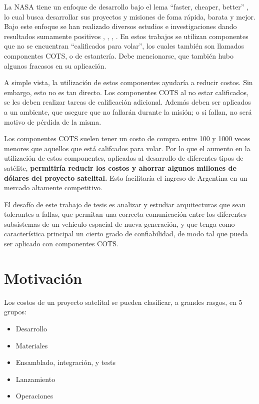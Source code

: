 La \ac{NASA} tiene un enfoque de desarrollo bajo el lema 
``faster, cheaper, better'' \cite{Forsberg99}, lo cual busca desarrollar sus proyectos y misiones 
de foma rápida, barata y mejor. Bajo este enfoque se han realizado diversos estudios e 
investigaciones dando resultados sumamente positivos \cite{Tai99}, \cite{Chau99}, 
\cite{Schneidewind98}, \cite{Forsberg99}. En estos trabajos se utilizan componentes que no se 
encuentran ``calificados para volar'',  los cuales también son llamados componentes \ac{COTS}, o de estantería. Debe mencionarse, que también hubo algunos 
fracasos en su aplicación. 

A simple vista, la utilización de estos componentes ayudaría a reducir costos. Sin embargo, esto 
no es tan directo. Los componentes \ac{COTS} al no estar calificados, se les deben realizar tareas 
de calificación adicional. Además deben ser aplicados a un ambiente, que asegure 
que no fallarán durante la misión; o si fallan, no será motivo de pérdida de la misma. 

Los componentes \ac{COTS} suelen tener un costo de compra entre 100 y 1000 veces menores que aquellos 
que está califcados para volar. Por lo que el aumento en la utilización de estos componentes, 
aplicados al desarrollo de diferentes tipos de satélite, \textbf{permitiría reducir los costos y 
ahorrar algunos millones de dólares del proyecto satelital.} Esto facilitaría el ingreso de 
Argentina en un mercado altamente competitivo.

El desafío de este trabajo de tesis es analizar y estudiar arquitecturas que sean tolerantes a 
fallas, que permitan una correcta comunicación entre los diferentes subsistemas de un vehículo 
espacial de nueva generación, y que tenga como característica principal un cierto grado de confiabilidad, de modo tal que pueda ser aplicado con componentes \ac{COTS}.

\section{Motivación}\label{chap:motivacion}
Los costos de un proyecto satelital se pueden clasificar, a grandes rasgos, en 5 grupos:
\begin{itemize}
 \item Desarrollo
 \item Materiales
 \item Ensamblado, integración, y tests
 \item Lanzamiento
 \item Operaciones
\end{itemize}

